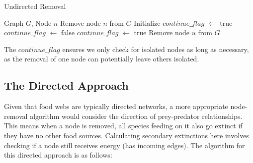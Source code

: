 \documentclass[a4paper, 12pt]{report}
\begin{document}
\begin{algorithm}
    \caption{Undirected Removal}
    \begin{algorithmic}[1]
    \small
    \Require Graph $G$, Node $n$
    \State Remove node $n$ from $G$ 
    \State Initialize $continue\_flag$ $\gets$ true
        \State $continue\_flag$ $\gets$ false
                \State $continue\_flag$ $\gets$ true
                \State Remove node $u$ from $G$
            \EndIf
        \EndFor
    \EndWhile
    \end{algorithmic}
\end{algorithm}

The $continue\_flag$ ensures we only check for isolated nodes as long as necessary, as the removal of one node can potentially leave others isolated.


\subsection{The Directed Approach}
Given that food webs are typically directed networks, a more appropriate node-removal algorithm would consider the direction of prey-predator relationships. This means when a node is removed, all species feeding on it also go extinct if they have no other food sources. Calculating secondary extinctions here involves checking if a node still receives energy (has incoming edges). The algorithm for this directed approach is as follows:
\end{document}
